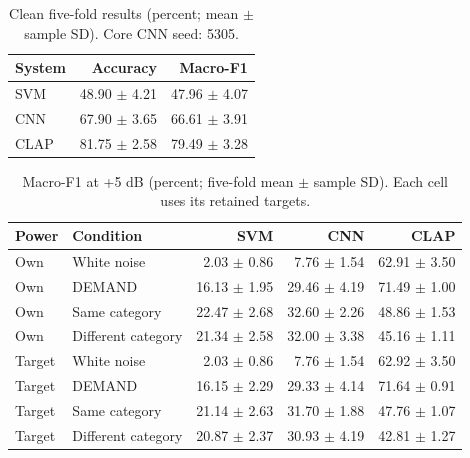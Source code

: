 \begin{table}[htbp]\centering
\caption{Clean five-fold results (percent; mean $\pm$ sample SD). Core CNN seed: 5305.}
\label{tab:clean}\begin{tabular}{lrr}\toprule System & Accuracy & Macro-F1\\\midrule
SVM & 48.90 $\pm$ 4.21 & 47.96 $\pm$ 4.07 \\
CNN & 67.90 $\pm$ 3.65 & 66.61 $\pm$ 3.91 \\
CLAP & 81.75 $\pm$ 2.58 & 79.49 $\pm$ 3.28 \\\bottomrule\end{tabular}\end{table}
\begin{table}[htbp]\centering
\caption{Macro-F1 at +5 dB (percent; five-fold mean $\pm$ sample SD). Each cell uses its retained targets.}
\label{tab:five}\begin{tabular}{llrrr}\toprule Power & Condition & SVM & CNN & CLAP\\\midrule
Own & White noise & 2.03 $\pm$ 0.86 & 7.76 $\pm$ 1.54 & 62.91 $\pm$ 3.50 \\
Own & DEMAND & 16.13 $\pm$ 1.95 & 29.46 $\pm$ 4.19 & 71.49 $\pm$ 1.00 \\
Own & Same category & 22.47 $\pm$ 2.68 & 32.60 $\pm$ 2.26 & 48.86 $\pm$ 1.53 \\
Own & Different category & 21.34 $\pm$ 2.58 & 32.00 $\pm$ 3.38 & 45.16 $\pm$ 1.11 \\
\midrule
Target & White noise & 2.03 $\pm$ 0.86 & 7.76 $\pm$ 1.54 & 62.92 $\pm$ 3.50 \\
Target & DEMAND & 16.15 $\pm$ 2.29 & 29.33 $\pm$ 4.14 & 71.64 $\pm$ 0.91 \\
Target & Same category & 21.14 $\pm$ 2.63 & 31.70 $\pm$ 1.88 & 47.76 $\pm$ 1.07 \\
Target & Different category & 20.87 $\pm$ 2.37 & 30.93 $\pm$ 4.19 & 42.81 $\pm$ 1.27 \\
\bottomrule\end{tabular}\end{table}
